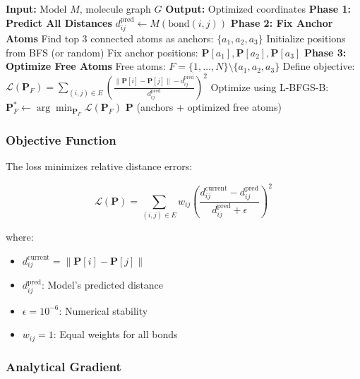 \documentclass[11pt,a4paper]{article}
\begin{document}
\begin{algorithm}
\caption{Distance Geometry Reconstruction}
\begin{algorithmic}[1]
\State \textbf{Input:} Model $M$, molecule graph $G$
\State \textbf{Output:} Optimized coordinates
\State
\State \textbf{Phase 1: Predict All Distances}
    \State $d_{ij}^{\text{pred}} \gets M(\text{bond}(i, j))$
\EndFor
\State
\State \textbf{Phase 2: Fix Anchor Atoms}
\State Find top 3 connected atoms as anchors: $\{a_1, a_2, a_3\}$
\State Initialize positions from BFS (or random)
\State Fix anchor positions: $\mathbf{P}[a_1], \mathbf{P}[a_2], \mathbf{P}[a_3]$
\State
\State \textbf{Phase 3: Optimize Free Atoms}
\State Free atoms: $F = \{1, \ldots, N\} \setminus \{a_1, a_2, a_3\}$
\State
\State Define objective:
\State $\mathcal{L}(\mathbf{P}_F) = \sum_{(i,j) \in E} \left(\frac{\|\mathbf{P}[i] - \mathbf{P}[j]\| - d_{ij}^{\text{pred}}}{d_{ij}^{\text{pred}}}\right)^2$
\State
\State Optimize using L-BFGS-B:
\State $\mathbf{P}_F^* \gets \arg\min_{\mathbf{P}_F} \mathcal{L}(\mathbf{P}_F)$
\State
\State \Return $\mathbf{P}$ (anchors + optimized free atoms)
\end{algorithmic}
\end{algorithm}

\subsubsection{Objective Function}

The loss minimizes relative distance errors:

\begin{equation}
\mathcal{L}(\mathbf{P}) = \sum_{(i,j) \in E} w_{ij} \left(\frac{d_{ij}^{\text{current}} - d_{ij}^{\text{pred}}}{d_{ij}^{\text{pred}} + \epsilon}\right)^2
\end{equation}

where:
\begin{itemize}
    \item $d_{ij}^{\text{current}} = \|\mathbf{P}[i] - \mathbf{P}[j]\|$
    \item $d_{ij}^{\text{pred}}$: Model's predicted distance
    \item $\epsilon = 10^{-6}$: Numerical stability
    \item $w_{ij} = 1$: Equal weights for all bonds
\end{itemize}

\subsubsection{Analytical Gradient}
\end{document}

